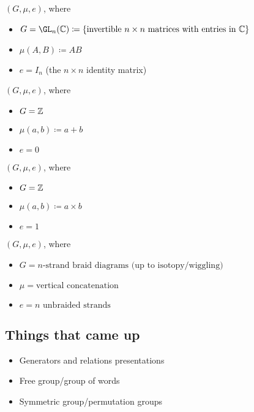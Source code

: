 \begin{example}
    $(G,\mu,e)$, where
    \begin{itemize}
        \item $G = \GL_n(\C) \coloneq \{ \text{invertible $n\times n$ matrices with entries in $\C$}\}$
        \item $\mu(A,B) \coloneq AB$
        \item $e = I_n$ (the $n\times n$ identity matrix)
    \end{itemize}
\end{example}

\begin{example}[Integers]
    $(G,\mu,e)$, where
    \begin{itemize}
        \item $G = \mathbb{Z}$
        \item $\mu(a,b) \coloneq a+b$
        \item $e = 0$
    \end{itemize}
\end{example}

\begin{example}
    $(G,\mu,e)$, where
    \begin{itemize}
        \item $G = \mathbb{Z}$
        \item $\mu(a,b) \coloneq a\times b$
        \item $e = 1$
    \end{itemize}
\end{example}

\begin{example}
    $(G,\mu,e)$, where
    \begin{itemize}
        \item $G = \text{$n$-strand braid diagrams (up to isotopy/wiggling)}$
        \item $\mu = \text{vertical concatenation}$
        \item $e = \text{$n$ unbraided strands}$
    \end{itemize}
\end{example}

\subsection*{Things that came up}
\begin{itemize}
    \item Generators and relations presentations
    \item Free group/group of words
    \item Symmetric group/permutation groups
\end{itemize}